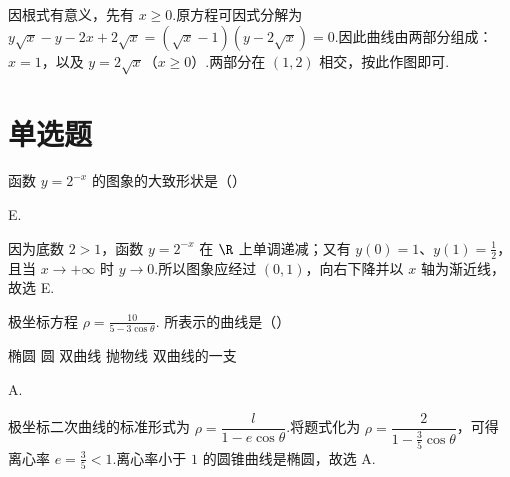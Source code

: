\begin{solution}
因根式有意义，先有 \(x\geqslant0\).原方程可因式分解为 \(y\sqrt{x}-y-2x+2\sqrt{x}=(\sqrt{x}-1)(y-2\sqrt{x})=0\).因此曲线由两部分组成：\(x=1\)，以及 \(y=2\sqrt{x}\)（\(x\geqslant0\)）.两部分在 \((1,2)\) 相交，按此作图即可.

\end{solution}

\section{单选题}

\begin{problem}

函数 \(y = 2^{-x} \) 的图象的大致形状是（\quad）

\choicesfive
    {}
    {}
    {}
    {}
    {}
\end{problem}

\begin{answer}
E.
\end{answer}

\begin{solution}
因为底数 \(2>1\)，函数 \(y=2^{-x}\) 在 \(\R\) 上单调递减；又有 \(y(0)=1\)、\(y(1)=\frac12\)，且当 \(x\to+\infty\) 时 \(y\to0\).所以图象应经过 \((0,1)\)，向右下降并以 \(x\) 轴为渐近线，故选 E.
\end{solution}

\begin{problem}

极坐标方程 \(\rho=\frac{10}{5-3\cos\theta} \). 所表示的曲线是（\quad）

\choicesfive
    {椭圆}
    {圆}
    {双曲线}
    {抛物线}
    {双曲线的一支}
\end{problem}

\begin{answer}
A.
\end{answer}

\begin{solution}
极坐标二次曲线的标准形式为 \(\rho=\dfrac{l}{1-e\cos\theta}\).将题式化为 \(\rho=\dfrac{2}{1-\frac35\cos\theta}\)，可得离心率 \(e=\frac35<1\).离心率小于 \(1\) 的圆锥曲线是椭圆，故选 A.
\end{solution}

